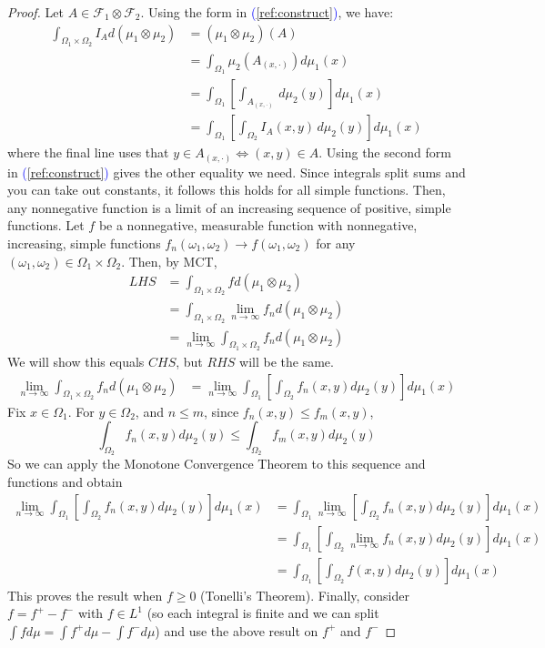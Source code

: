 \documentclass[11pt,a4paper]{article}
\theoremstyle{definition}
\begin{document}
\begin{proof}
Let $A \in \mathcal{F}_1 \otimes \mathcal{F}_2$. Using the form in \textcolor{blue}{(}\ref{ref:construct}\textcolor{blue}{)}, we have:
\begin{align*}
\int _{\Omega_1 \times \Omega_2} I_A d (\mu_1 \otimes \mu_2) & = (\mu_1 \otimes \mu_2)(A) \\ & = \int _{\Omega_1} \mu _2 (A_{(x, \cdot)}) d \mu _1 (x) \\ & = \int_{\Omega_1} \left[ \int_{A_{(x, \cdot)}}  \, d\mu_2(y) \right] d\mu_1(x) \\ & = \int_{\Omega_1} \left[ \int_{\Omega_2} I_A(x,y) \, d\mu_2(y) \right] d\mu_1(x)
\end{align*}
where the final line uses that $y \in A_{(x, \cdot)} \iff (x,y) \in A $. Using the second form in \textcolor{blue}{(}\ref{ref:construct}\textcolor{blue}{)} gives the other equality we need. Since integrals split sums and you can take out constants, it follows this holds for all simple functions. Then, any nonnegative function is a limit of an increasing sequence of positive, simple functions. Let $f$ be a nonnegative, measurable function with nonnegative, increasing, simple functions $f_n (\omega_1, \omega_2) \to f(\omega_1, \omega_2)$ for any $(\omega_1, \omega_2) \in \Omega_1 \times \Omega_2$. Then, by MCT, \begin{align*}
LHS & = \int _{\Omega_1 \times \Omega_2} f d(\mu_1 \otimes \mu_2)
\\ & = \int _{\Omega_1 \times \Omega_2} \lim \limits _{n \to \infty} f_n d(\mu_1 \otimes \mu_2)
\\ & = \lim \limits _{n \to \infty}\int _{\Omega_1 \times \Omega_2} f_n d(\mu_1 \otimes \mu_2)
\end{align*}
We will show this equals $CHS$, but $RHS$ will be the same.
\begin{align*}
\lim \limits _{n \to \infty}\int _{\Omega_1 \times \Omega_2} f_n d(\mu_1 \otimes \mu_2) & = \lim \limits _{n \to \infty} \int _{\Omega_1} \left [ \int_{\Omega_2} f_n(x,y) d \mu _2 (y) \right] d \mu _1 (x)
\end{align*}
Fix $x \in \Omega_1$. For $y \in \Omega_2$, and $n \le m$, since $f_n (x,y) \le f_m (x,y)$,  \[
\int _{\Omega_2} f_n (x,y) d\mu _2 (y) \le \int _{\Omega_2} f_m (x,y) d\mu _2 (y)
\]
So we can apply the Monotone Convergence Theorem to this sequence and functions and obtain \begin{align*}
\lim \limits _{n \to \infty} \int _{\Omega_1} \left [ \int_{\Omega_2} f_n(x,y) d \mu _2 (y) \right] d \mu _1 (x) & =  \int _{\Omega_1} \lim \limits _{n \to \infty} \left [ \int_{\Omega_2} f_n(x,y) d \mu _2 (y) \right] d \mu _1 (x) \\ & =  \int _{\Omega_1} \left [  \int_{\Omega_2}\lim \limits _{n \to \infty} f_n(x,y) d \mu _2 (y) \right] d \mu _1 (x) \\ & = \int _{\Omega_1} \left [  \int_{\Omega_2}f (x,y) d \mu _2 (y) \right] d \mu _1 (x) 
\end{align*}
This proves the result when $f \ge 0$ (Tonelli's Theorem).
Finally, consider $f = f^+ - f^-$ with $f \in L^1$ (so each integral is finite and we can split $\int f d\mu = \int f^+ d\mu - \int f^- d\mu$) and use the above result on $f^+$ and $f^-$
\end{proof}
\end{document}
